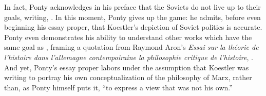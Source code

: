 In fact, Ponty acknowledges in his preface that the Soviets do not live up to their goals,
writing, . In this moment, Ponty gives up the game: he admits, before
even beginning his essay proper, that Koestler's depiction of Soviet politics is
accurate. Ponty even demonstrates his ability to understand other works which have the
same goal as \dark{}, framing a quotation from Raymond Aron's \textit{Essai sur la théorie
de l'histoire dans l'allemagne contempoiraine la philosophie critique de l'histoire},
. And yet, Ponty's essay proper labors
under the assumption that Koestler was writing to portray his own conceptualization of the
philosophy of Marx, rather than, as Ponty himself puts it, \enquote{to express a view that
was not his own.}





